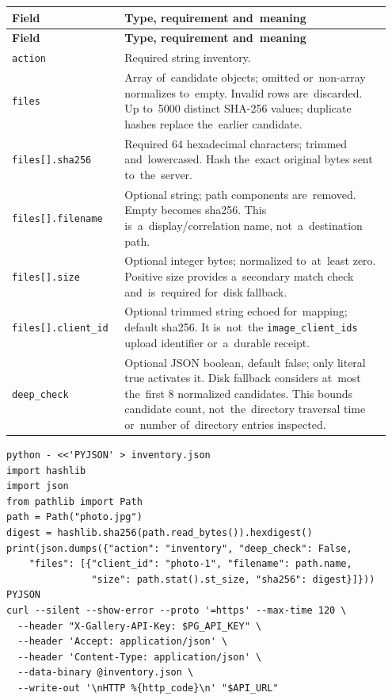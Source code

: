 \documentclass[11pt,a4paper]{article}
\newcommand{\codeword}[1]{\nolinkurl{#1}}
\begin{document}
\begin{longtable}{@{}>{\RaggedRight\arraybackslash}p{0.28\linewidth}>{\RaggedRight\arraybackslash}p{0.67\linewidth}@{}}
\toprule
\textbf{Field} & \textbf{Type, requirement and~meaning} \\
\midrule
\endfirsthead
\toprule
\textbf{Field} & \textbf{Type, requirement and~meaning} \\
\midrule
\endhead
\bottomrule
\endfoot
\codeword{action} & Required string inventory. \\
\codeword{files} & Array of~candidate objects; omitted or~non-array normalizes to~empty.
Invalid rows are~discarded. Up to~5000 distinct SHA-256 values; duplicate hashes replace
the~earlier candidate. \\
\codeword{files[].sha256} & Required 64 hexadecimal characters; trimmed and~lowercased. Hash
the~exact original bytes sent to~the~server. \\
\codeword{files[].filename} & Optional string; path components are~removed. Empty becomes
sha256. This is~a~display/correlation name, not~a~destination path. \\
\codeword{files[].size} & Optional integer bytes; normalized to~at~least zero. Positive size
provides a~secondary match check and~is~required for~disk fallback. \\
\codeword{files[].client_id} & Optional trimmed string echoed for~mapping; default sha256.
It is~not~the \codeword{image_client_ids} upload identifier or~a~durable receipt. \\
\codeword{deep_check} & Optional JSON boolean, default false; only literal true activates
it. Disk fallback considers at~most the~first 8 normalized candidates. This bounds candidate
count, not~the~directory traversal time or~number of~directory entries inspected. \\
\end{longtable}

\begin{lstlisting}[language={}]
python - <<'PYJSON' > inventory.json
import hashlib
import json
from pathlib import Path
path = Path("photo.jpg")
digest = hashlib.sha256(path.read_bytes()).hexdigest()
print(json.dumps({"action": "inventory", "deep_check": False,
    "files": [{"client_id": "photo-1", "filename": path.name,
               "size": path.stat().st_size, "sha256": digest}]}))
PYJSON
curl --silent --show-error --proto '=https' --max-time 120 \
  --header "X-Gallery-API-Key: $PG_API_KEY" \
  --header 'Accept: application/json' \
  --header 'Content-Type: application/json' \
  --data-binary @inventory.json \
  --write-out '\nHTTP %{http_code}\n' "$API_URL"
\end{lstlisting}
\end{document}
